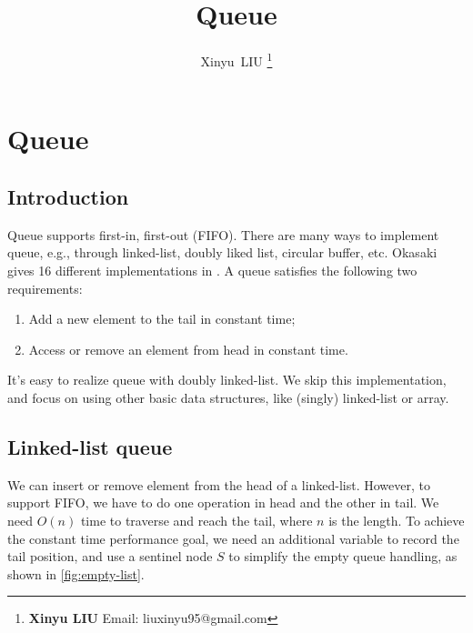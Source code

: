 \documentclass[b5paper]{article}
\begin{document}
\title{Queue}

\author{Xinyu~LIU
\thanks{{\bfseries Xinyu LIU} \newline
  Email: liuxinyu95@gmail.com \newline}
  }

\maketitle
\fi


\ifx\wholebook\relax
\chapter{Queue}
\fi

\section{Introduction}
\label{introduction}

Queue supports first-in, first-out (FIFO). There are many ways to implement queue, e.g., through linked-list, doubly liked list, circular buffer, etc. Okasaki gives 16 different implementations in \cite{okasaki-book}. A queue satisfies the following two requirements:

\begin{enumerate}
\item Add a new element to the tail in constant time;
\item Access or remove an element from head in constant time.
\end{enumerate}

It's easy to realize queue with doubly linked-list. We skip this implementation, and focus on using other basic data structures, like (singly) linked-list or array.

\section{Linked-list queue}

We can insert or remove element from the head of a linked-list. However, to support FIFO, we have to do one operation in head and the other in tail. We need $O(n)$ time to traverse and reach the tail, where $n$ is the length. To achieve the constant time performance goal, we need an additional variable to record the tail position, and use a sentinel node $S$ to simplify the empty queue handling, as shown in \cref{fig:empty-list}.
\end{document}
